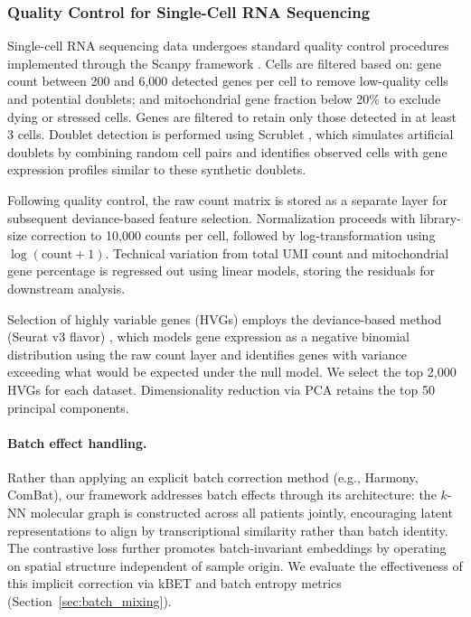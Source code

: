 \documentclass{article}
\begin{document}
\subsubsection{Quality Control for Single-Cell RNA Sequencing}

Single-cell RNA sequencing data undergoes standard quality control procedures implemented through the Scanpy framework \citep{wolf2018scanpy}. Cells are filtered based on: gene count between 200 and 6,000 detected genes per cell to remove low-quality cells and potential doublets; and mitochondrial gene fraction below 20\% to exclude dying or stressed cells. Genes are filtered to retain only those detected in at least 3 cells. Doublet detection is performed using Scrublet \citep{wolock2019scrublet}, which simulates artificial doublets by combining random cell pairs and identifies observed cells with gene expression profiles similar to these synthetic doublets.

Following quality control, the raw count matrix is stored as a separate layer for subsequent deviance-based feature selection. Normalization proceeds with library-size correction to 10,000 counts per cell, followed by log-transformation using $\log(\text{count} + 1)$. Technical variation from total UMI count and mitochondrial gene percentage is regressed out using linear models, storing the residuals for downstream analysis.

Selection of highly variable genes (HVGs) employs the deviance-based method (Seurat v3 flavor) \citep{stuart2019integrative}, which models gene expression as a negative binomial distribution using the raw count layer and identifies genes with variance exceeding what would be expected under the null model. We select the top 2,000 HVGs for each dataset. Dimensionality reduction via PCA retains the top 50 principal components.

\paragraph{Batch effect handling.} Rather than applying an explicit batch correction method (e.g., Harmony, ComBat), our framework addresses batch effects through its architecture: the $k$-NN molecular graph is constructed across all patients jointly, encouraging latent representations to align by transcriptional similarity rather than batch identity. The contrastive loss further promotes batch-invariant embeddings by operating on spatial structure independent of sample origin. We evaluate the effectiveness of this implicit correction via kBET and batch entropy metrics (Section~\ref{sec:batch_mixing}).
\end{document}
